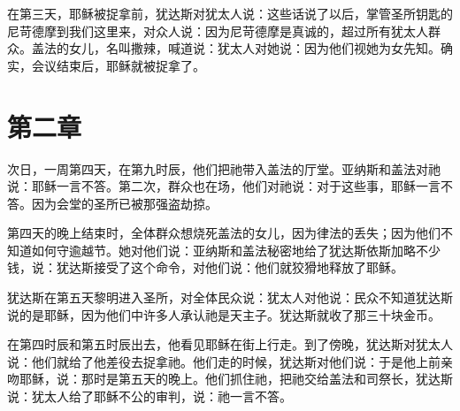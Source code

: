 在第三天，耶稣被捉拿前，犹达斯对犹太人说：这些话说了以后，掌管圣所钥匙的尼苛德摩到我们这里来，对众人说：因为尼苛德摩是真诚的，超过所有犹太人群众。盖法的女儿，名叫撒辣，喊道说：犹太人对她说：因为他们视她为女先知。确实，会议结束后，耶稣就被捉拿了。\par


\section{第二章}

次日，一周第四天，在第九时辰，他们把祂带入盖法的厅堂。亚纳斯和盖法对祂说：耶稣一言不答。第二次，群众也在场，他们对祂说：对于这些事，耶稣一言不答。因为会堂的圣所已被那强盗劫掠。\par

第四天的晚上结束时，全体群众想烧死盖法的女儿，因为律法的丢失；因为他们不知道如何守逾越节。她对他们说：亚纳斯和盖法秘密地给了犹达斯依斯加略不少钱，说：犹达斯接受了这个命令，对他们说：他们就狡猾地释放了耶稣。\par

犹达斯在第五天黎明进入圣所，对全体民众说：犹太人对他说：民众不知道犹达斯说的是耶稣，因为他们中许多人承认祂是天主子。犹达斯就收了那三十块金币。\par

在第四时辰和第五时辰出去，他看见耶稣在街上行走。到了傍晚，犹达斯对犹太人说：他们就给了他差役去捉拿祂。他们走的时候，犹达斯对他们说：于是他上前亲吻耶稣，说：那时是第五天的晚上。他们抓住祂，把祂交给盖法和司祭长，犹达斯说：犹太人给了耶稣不公的审判，说：祂一言不答。\par


